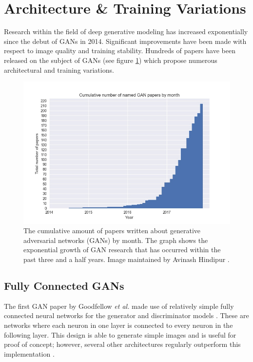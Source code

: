 \documentclass[11pt]{article}
\begin{document}
\section{Architecture \& Training Variations}
Research within the field of deep generative modeling has increased exponentially since the debut of GANs in 2014. Significant improvements have been made with respect to image quality and training stability. Hundreds of papers have been released on the subject of GANs (see figure \ref{fig:CumulativeNumberofGANPapersbyMonth}) which propose numerous architectural and training variations.

\begin{figure}
\centering
\includegraphics[scale=0.43]{cumulative_gans}
\caption{The cumulative amount of papers written about generative adversarial networks (GANs) by month. The graph shows the exponential growth of GAN research that has occurred within the past three and a half years. Image maintained by Avinash Hindipur \citep{November2017GANZoo}.}
\label{fig:CumulativeNumberofGANPapersbyMonth}
\end{figure}

\subsection{Fully Connected GANs}
The first GAN paper by Goodfellow \textit{et al.} made use of relatively simple fully connected neural networks for the generator and discriminator models \citep{2017arXiv171007035C}. These are networks where each neuron in one layer is connected to every neuron in the following layer. This design is able to generate simple images and is useful for proof of concept; however, several other architectures regularly outperform this implementation \citep{2017arXiv171007035C}.
\end{document}
